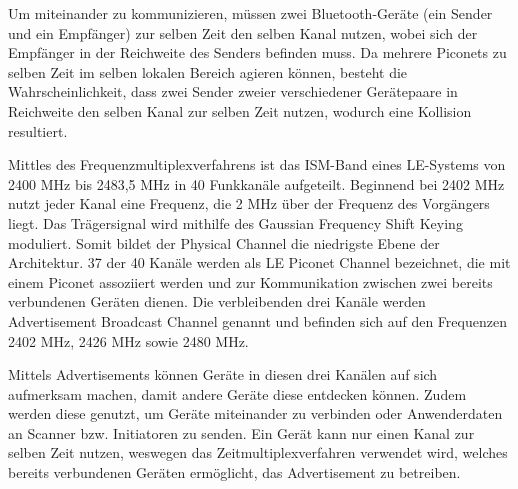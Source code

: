 Um miteinander zu kommunizieren, müssen zwei Bluetooth-Geräte (ein Sender und ein Empfänger) zur selben Zeit den selben Kanal nutzen, wobei sich der Empfänger in der Reichweite des Senders befinden muss. Da mehrere Piconets zu selben Zeit im selben lokalen Bereich agieren können, besteht die Wahrscheinlichkeit, dass zwei Sender zweier verschiedener Gerätepaare in Reichweite den selben Kanal zur selben Zeit nutzen, wodurch eine Kollision resultiert.

Mittles des Frequenzmultiplexverfahrens ist das ISM-Band eines LE-Systems von 2400 MHz bis 2483,5 MHz in 40 Funkkanäle aufgeteilt. Beginnend bei 2402 MHz nutzt jeder Kanal eine Frequenz, die 2 MHz über der Frequenz des Vorgängers liegt.
Das Trägersignal wird mithilfe des Gaussian Frequency Shift Keying moduliert.
Somit bildet der Physical Channel die niedrigste Ebene der Architektur. 37 der 40 Kanäle werden als LE Piconet Channel bezeichnet, die mit einem Piconet assoziiert werden und zur Kommunikation zwischen zwei bereits verbundenen Geräten dienen. Die verbleibenden drei Kanäle werden Advertisement Broadcast Channel genannt und befinden sich auf den Frequenzen 2402 MHz, 2426 MHz sowie 2480 MHz.

Mittels Advertisements können Geräte in diesen drei Kanälen auf sich aufmerksam machen, damit andere Geräte diese entdecken können. Zudem werden diese genutzt, um Geräte miteinander zu verbinden oder Anwenderdaten an Scanner bzw. Initiatoren zu senden. Ein Gerät kann nur einen Kanal zur selben Zeit nutzen, weswegen das Zeitmultiplexverfahren verwendet wird, welches bereits verbundenen Geräten ermöglicht, das Advertisement zu betreiben.